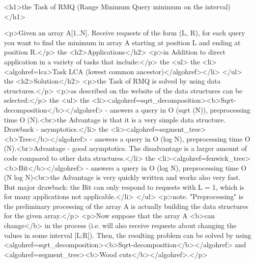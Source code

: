 <h1>the Task of RMQ (Range Minimum Query minimum on the interval)</h1>

<p>Given an array A[1..N]. Receive requests of the form (L, R), for each query you want to find the minimum in array A starting at position L and ending at position R.</p>
the <h2>Applications</h2>
<p>in Addition to direct application in a variety of tasks that include:</p>
the <ul>
the <li><algohref=lca>Task LCA (lowest common ancestor)</algohref></li>
</ul>
the <h2>Solution</h2>
<p>the Task of RMQ is solved by using data structures.</p>
<p>as described on the website of the data structures can be selected:</p>
the <ul>
the <li><algohref=sqrt_decomposition><b>Sqrt-decomposition</b></algohref> - answers a query in O (sqrt (N)), preprocessing time O (N).<br>the Advantage is that it is a very simple data structure. Drawback - asymptotics.</li>
the <li><algohref=segment_tree><b>Tree</b></algohref> - answers a query in O (log N), preprocessing time O (N).<br>Advantage - good asymptotics. The disadvantage is a larger amount of code compared to other data structures.</li>
the <li><algohref=fenwick_tree><b>Bit</b></algohref> - answers a query in O (log N), preprocessing time O (N log N)<br>the Advantage is very quickly written and works also very fast. But major drawback: the Bit can only respond to requests with L = 1, which is for many applications not applicable.</li>
</ul>
<p>note. "Preprocessing" is the preliminary processing of the array A is actually building the data structures for the given array.</p>
<p>Now suppose that the array A <b>can change</b> in the process (i.e. will also receive requests about changing the values in some interval [L;R]). Then, the resulting problem can be solved by using <algohref=sqrt_decomposition><b>Sqrt-decomposition</b></algohref> and <algohref=segment_tree><b>Wood cuts</b></algohref>.</p>